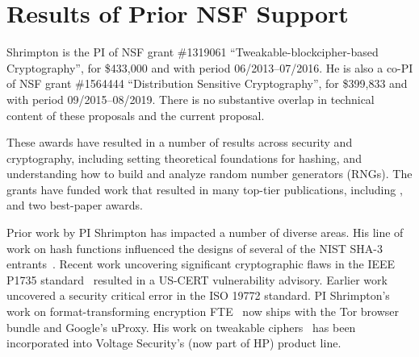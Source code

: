 \section{Results of Prior NSF Support}
\label{sec:prior}


Shrimpton is the PI of NSF grant \#1319061 
``Tweakable-blockcipher-based Cryptography'', for \$433,000 and with
period 06/2013--07/2016.  He is also a co-PI of NSF grant \#1564444
``Distribution Sensitive Cryptography'', for \$399,833 and with period 09/2015--08/2019.
%
There is no substantive overlap in technical
content of these proposals and the current proposal.

 These awards have resulted in a number of results
across security and cryptography, including setting theoretical foundations for
hashing, and understanding how
to build and analyze random number generators (RNGs). The grants have funded work that
resulted in many top-tier publications, including
\cite{DRS09,BCS-journal09,OSS,BRSS10,fischlin2010random,RSS,PRS11,dyer2012peek,clrw,tct,Dyer-2013,luchaup2014libfte,luchaup2014formatted},
and two best-paper awards. 

  Prior work by PI Shrimpton has impacted a
number of diverse areas.  His line of work on hash functions influenced the designs of several of the NIST
SHA-3 entrants~\cite{DRS09,BCS-journal09,BRSS10,RSS}.  
%
Recent work uncovering significant cryptographic flaws in the IEEE
P1735 standard~\cite{CNS+17} resulted in a US-CERT vulnerability
advisory.  Earlier work~\cite{NRS} uncovered a security critical error
in the ISO 19772 standard.
%
PI Shrimpton's work on format-transforming encryption FTE~\cite{Dyer-2013,luchaup2014libfte,luchaup2014formatted}
now ships with the Tor browser bundle and Google's uProxy. 
%
His work on tweakable ciphers~\cite{clrw,tct} has been incorporated into
Voltage Security's (now part of HP) product line.






